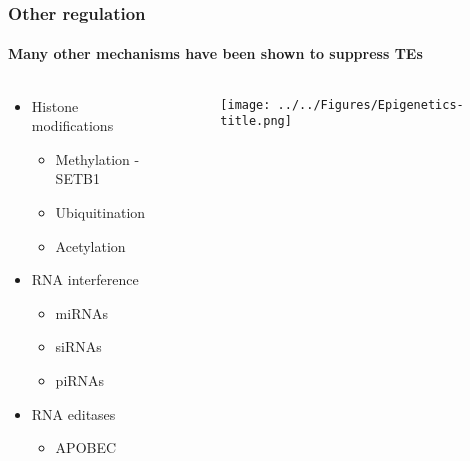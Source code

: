 \documentclass{beamer}
\begin{document}
		\begin{frame} %
			
			\frametitle{Other regulation}
			\framesubtitle{Many other mechanisms have been shown to suppress TEs}
			\begin{columns}
				\begin{column}{0.4\linewidth}
					\begin{itemize}
						\item Histone modifications
						\begin{itemize}
							\item Methylation - SETB1
							\item Ubiquitination
							\item Acetylation
						\end{itemize}
						\item RNA interference
						\begin{itemize}
							\item miRNAs
							\item siRNAs
							\item piRNAs
						\end{itemize}
						\item RNA editases
						\begin{itemize}
							\item APOBEC
						\end{itemize}
					\end{itemize}
				\end{column}
				\begin{column}{0.6\linewidth}
					\begin{figure}
						\texttt{[image: ../../Figures/Epigenetics-title.png]}
					\end{figure}
					\end{column}
			\end{columns}
		\end{frame}	
\end{document}
